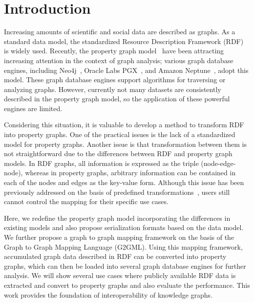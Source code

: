 \documentclass[runningheads]{llncs}
\begin{document}
\section{Introduction}

Increasing amounts of scientific and social data are described as graphs. 
As a standard data model, the standardized Resource Description Framework (RDF)~\cite{rdf} is widely used. 
Recently, the property graph model~\cite{angles1,angles2} have been attracting increasing attention in the context of graph analysis; various graph database engines, including Neo4j~\cite{neo4j}, Oracle Labs PGX~\cite{pgx}, and Amazon Neptune~\cite{neptune}, adopt this model. These graph database engines support algorithms for traversing or analyzing graphs. However, currently not many datasets are consistently described in the property graph model, so the application of these powerful engines are limited.

Considering this situation, it is valuable to develop a method to transform RDF into property graphs. One of the practical issues is the lack of a standardized model for property graphs. 
Another issue is that transformation between them is not straightforward due to the differences between RDF and property graph models. 
In RDF graphs, all information is expressed as the triple (node-edge-node), whereas in property graphs, arbitrary information can be contained in each of the nodes and edges as the key-value form. 
Although this issue has been previously addressed on the basis of predefined transformations~\cite{hartig},
users still cannot control the mapping for their specific use cases.

Here, we redefine the property graph model incorporating the differences in existing models and also propose serialization formats based on the data model. We further propose a graph to graph mapping framework on the basis of the Graph to Graph Mapping Language (G2GML). Using this mapping framework, accumulated graph data described in RDF can be converted into property graphs, which can then be loaded into several graph database engines for further analysis. We will show several use cases where publicly available RDF data is extracted and convert to property graphs and also evaluate the performance. This work provides the foundation of interoperability of knowledge graphs.
\end{document}
